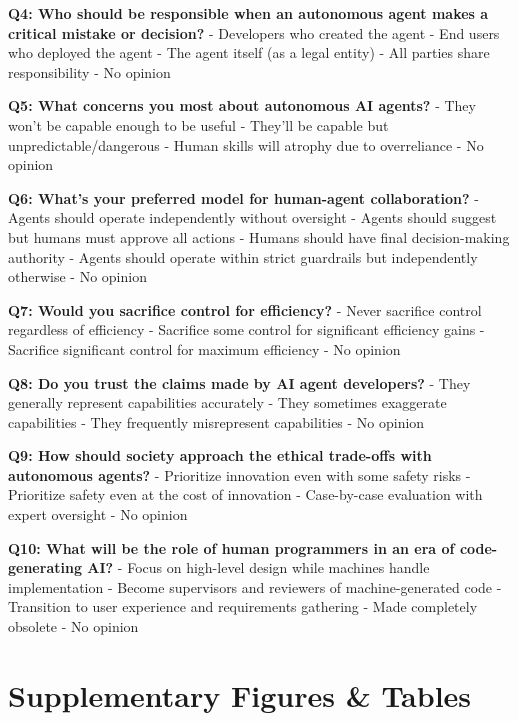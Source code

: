 \documentclass{article}
\begin{document}
\textbf{Q4: Who should be responsible when an autonomous agent makes a
critical mistake or decision?} - Developers who created the agent - End
users who deployed the agent - The agent itself (as a legal entity) -
All parties share responsibility - No opinion

\textbf{Q5: What concerns you most about autonomous AI agents?} - They
won't be capable enough to be useful - They'll be capable but
unpredictable/dangerous - Human skills will atrophy due to overreliance
- No opinion

\textbf{Q6: What's your preferred model for human-agent collaboration?}
- Agents should operate independently without oversight - Agents should
suggest but humans must approve all actions - Humans should have final
decision-making authority - Agents should operate within strict
guardrails but independently otherwise - No opinion

\textbf{Q7: Would you sacrifice control for efficiency?} - Never
sacrifice control regardless of efficiency - Sacrifice some control for
significant efficiency gains - Sacrifice significant control for maximum
efficiency - No opinion

\textbf{Q8: Do you trust the claims made by AI agent developers?} - They
generally represent capabilities accurately - They sometimes exaggerate
capabilities - They frequently misrepresent capabilities - No opinion

\textbf{Q9: How should society approach the ethical trade-offs with
autonomous agents?} - Prioritize innovation even with some safety risks
- Prioritize safety even at the cost of innovation - Case-by-case
evaluation with expert oversight - No opinion

\textbf{Q10: What will be the role of human programmers in an era of
code-generating AI?} - Focus on high-level design while machines handle
implementation - Become supervisors and reviewers of machine-generated
code - Transition to user experience and requirements gathering - Made
completely obsolete - No opinion

\section{Supplementary Figures \&
Tables}\label{supplementary-figures-tables}
\end{document}
